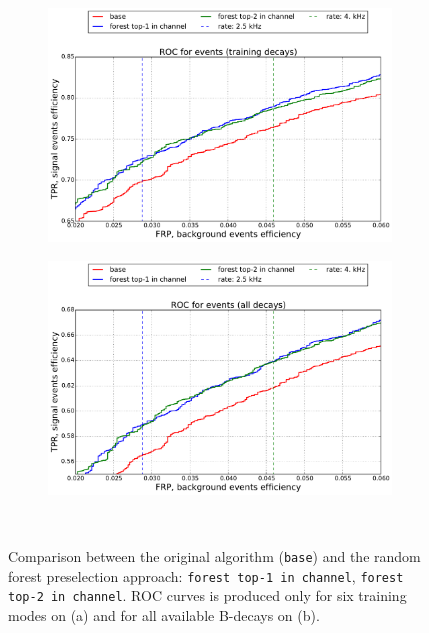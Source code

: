 \documentclass{llncs}
\begin{document}
\begin{figure}
	\begin{center}
    	\begin{subfigure}[b]{0.45\textwidth}
    		\includegraphics[width=\textwidth]{../../img/roc_training_top_forest} \caption{}
    	\end{subfigure} %
    	\begin{subfigure}[b]{0.45\textwidth}
    		\includegraphics[width=\textwidth]{../../img/roc_all_top_forest} \caption{} %
    	\end{subfigure}
    \end{center}
  \caption{Comparison between the original algorithm (\texttt{base}) and the random forest preselection approach: \texttt{forest top-1 in channel}, \texttt{forest top-2 in channel}. ROC curves is produced only for six training modes on (a) and for all available B-decays on (b).}~\label{fig:forest_channel}
\end{figure}
\end{document}

